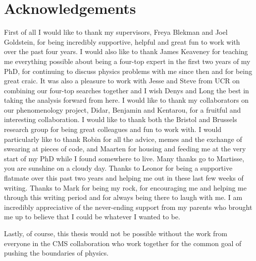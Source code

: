 \chapter*{Acknowledgements} 

First of all I would like to thank my supervisors, Freya Blekman and Joel Goldstein, for being incredibly supportive, helpful and great fun to work with over the past four years. I would also like to thank James Keaveney for teaching me everything possible about being a four-top expert in the first two years of my PhD, for continuing to discuss physics problems with me since then and for being great craic. It was also a pleasure to work with Jesse and Steve from UCR on combining our four-top searches together and I wish Denys and Long the best in taking the analysis forward from here.
I would like to thank my collaborators on our phenomenology project, Didar, Benjamin and Kentarou, for a fruitful and interesting collaboration. I would like to thank both the Bristol and Brussels research group for being great colleagues and fun to work with. I would particularly like to thank Robin for all the advice, memes and the exchange of swearing at pieces of code, and Maarten for housing and feeding me at the very start of my PhD while I found somewhere to live. Many thanks go to Martisse, you are sunshine on a cloudy day. 
Thanks to Leonor for being a supportive flatmate over this past two years and helping me out in these last few weeks of writing. Thanks to Mark for being my rock, for encouraging me and helping me through this writing period and for always being there to laugh with me.
I am incredibly appreciative of the never-ending support from my parents who brought me up to believe that I could be whatever I wanted to be.

Lastly, of course, this thesis would not be possible without the work from everyone in the CMS collaboration who work together for the common goal of pushing the boundaries of physics.

